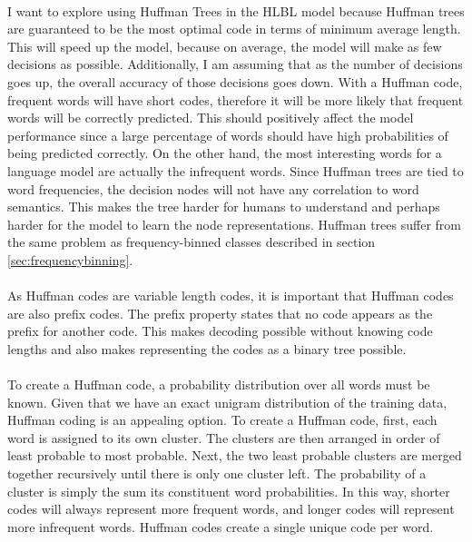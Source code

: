 \paragraph{}
I want to explore using Huffman Trees in the HLBL model because Huffman trees are guaranteed to be the most optimal code in terms of minimum average length. This will speed up the model, because on average, the model will make as few decisions as possible. Additionally, I am assuming that as the number of decisions goes up, the overall accuracy of those decisions goes down. With a Huffman code, frequent words will have short codes, therefore it will be more likely that frequent words will be correctly predicted. This should positively affect the model performance since a large percentage of words should have high probabilities of being predicted correctly. On the other hand, the most interesting words for a language model are actually the infrequent words.  Since Huffman trees are tied to word frequencies, the decision nodes will not have any correlation to word semantics. This makes the tree harder for humans to understand and perhaps harder for the model to learn the node representations.  Huffman trees suffer from the same problem as frequency-binned classes described in section \ref{sec:frequencybinning}.
\paragraph{}
As Huffman codes are variable length codes, it is important that Huffman codes are also prefix codes. The prefix property states that no code appears as the prefix for another code. This makes decoding possible without knowing code lengths and also makes representing the codes as a binary tree possible. 
\paragraph{}
To create a Huffman code, a probability distribution over all words must be known. Given that we have an exact unigram distribution of the training data, Huffman coding is an appealing option. To create a Huffman code, first, each word is assigned to its own cluster.  The clusters are then arranged in order of least probable to most probable. Next, the two least probable clusters are merged together recursively until there is only one cluster left. The probability of a cluster is simply the sum its constituent word probabilities. In this way, shorter codes will always represent more frequent words, and longer codes will represent more infrequent words. Huffman codes create a single unique code per word.
